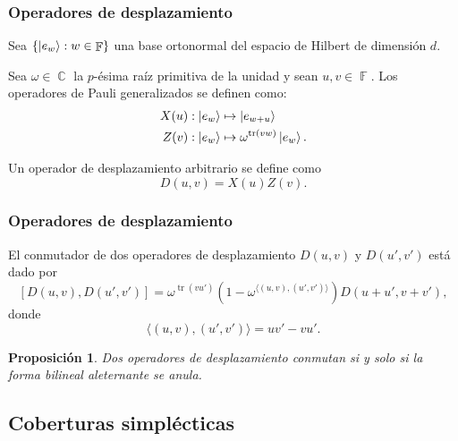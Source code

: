 \documentclass[10pt]{beamer}
\DeclareMathOperator{\C}{\mathbb{C}}
\DeclareMathOperator{\F}{\mathbb{F}}
\DeclareMathOperator{\tr}{tr}
\newtheorem{proposition}{Proposición}
\begin{document}
  \begin{frame}
    \frametitle{Operadores de desplazamiento}

    Sea $\{\ket{e_w} : w \in \F\}$ una base ortonormal del
    espacio de Hilbert de dimensión $d$.

    \begin{definition}
      Sea $\omega \in \C$ la $p$-ésima raíz primitiva de la
      unidad y sean $u, v \in \F$. Los operadores de Pauli
      generalizados se definen como:
      \begin{align}
        X(u) &: \ket{e_w} \mapsto \ket{e_{w+u}} \\
        Z(v) &: \ket{e_w} \mapsto \omega^{\tr(vw)}
        \ket{e_w}.
      \end{align}
    \end{definition}

    \begin{definition}
      Un operador de desplazamiento arbitrario se define como
      \begin{equation}
        D(u,v) 
        = X(u) Z(v).
      \end{equation}
    \end{definition}
  \end{frame}

  \begin{frame}
    \frametitle{Operadores de desplazamiento}

    El conmutador de dos operadores de desplazamiento
    $D(u,v)$ y $D(u',v')$ está dado por
    \begin{equation}
      \left[
        D(u,v), D(u',v')
      \right]
      = \omega^{\tr(vu')} \left( 1 - \omega^{\langle (u,v),
      (u',v') \rangle} \right) D(u+u', v+v'),
    \end{equation}
    donde
    \begin{equation}
      \langle (u,v), (u',v') \rangle
      = uv' - vu'.
    \end{equation}

    \begin{proposition}
      Dos operadores de desplazamiento conmutan si y solo si
      la forma bilineal aleternante se anula.
    \end{proposition}
  \end{frame}

  \subsection{Coberturas simplécticas}
\end{document}
